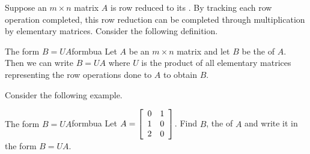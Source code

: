 Suppose an $m \times n$ matrix $A$ is row reduced to its {\rref}. By tracking each row operation completed, this row reduction can be completed through multiplication by elementary matrices. Consider the following definition.

\begin{definition}{The form $B=UA$}{formbua}
Let $A$ be an $m \times n$ matrix and let $B$ be the {\rref} of $A$. Then we can write $B = UA$ where $U$ is the product of all elementary matrices representing the row operations done to $A$ to obtain $B$. 
\end{definition}

Consider the following example.

\begin{example}{The form $B=UA$}{formbua}
Let $A = \left[
\begin{array}{rr}
0 & 1 \\
1 & 0 \\
2 & 0
\end{array}
\right]$. Find $B$, the {\rref} of $A$ and write it in the form $B=UA$.
\end{example}


